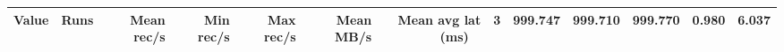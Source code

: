 \begin{tabular}{lrrrrrr}
\hline
Value & Runs & Mean rec/s & Min rec/s & Max rec/s & Mean MB/s & Mean avg lat (ms) \
 & 3 & 999.747 & 999.710 & 999.770 & 0.980 & 6.037 \\
\hline
\end{tabular}

